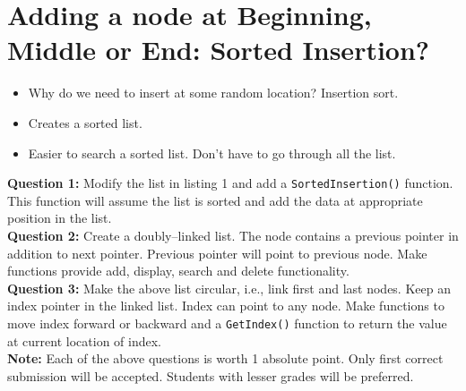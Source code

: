\documentclass[12pt,a4paper]{article}
\begin{document}
\section{Adding a node at Beginning, Middle or End: Sorted Insertion?}
\begin{itemize}
\item Why do we need to insert at some random location? Insertion sort.
\item Creates a sorted list.
\item Easier to search a sorted list. Don't have to go through all the list.
\end{itemize}
\textbf{Question 1:} Modify the list in listing 1 and add a \verb|SortedInsertion()| function. This function will assume the list is sorted and add the data at appropriate position in the list.\\
\textbf{Question 2:} Create a doubly--linked list. The node contains a previous pointer in addition to next pointer. Previous pointer will point to previous node. Make functions provide add, display, search and delete functionality.\\
\textbf{Question 3:} Make the above list circular, i.e., link first and last nodes. Keep an index pointer in the linked list. Index can point to any node. Make functions to move index forward or backward and a \verb|GetIndex()| function to return the value at current location of index.\\
\textbf{Note:} Each of the above questions is worth 1 absolute point. Only first correct submission will be accepted. Students with lesser grades will be preferred.
%
%
\end{document}
